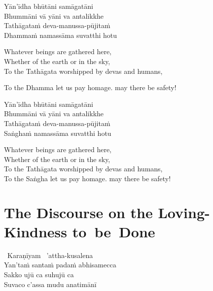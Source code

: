 \begin{pali-hang-continued}
  Yān'īdha bhūtāni samāgatāni\\
  Bhummāni vā yāni va antalikkhe\\
  Tathāgataṁ deva-manussa-pūjitaṁ\\
  Dhammaṁ namassāma suvatthi hotu
\end{pali-hang-continued}

\begin{english-verses}
  Whatever beings are gathered here,\\
  Whether of the earth or in the sky,\\
  To the Tathāgata worshipped by devas and humans,\\
  \begin{english-hang-together}
  To the Dhamma let us pay homage. may there be safety!
  \end{english-hang-together}
\end{english-verses}

\ifbfive\clearpage\fi

\begin{pali-hang-continued}
  Yān'īdha bhūtāni samāgatāni\\
  Bhummāni vā yāni va antalikkhe\\
  Tathāgataṁ deva-manussa-pūjitaṁ\\
  Saṅghaṁ namassāma suvatthi hotu
\end{pali-hang-continued}

\begin{english-verses}
  Whatever beings are gathered here,\\
  Whether of the earth or in the sky,\\
  To the Tathāgata worshipped by devas and humans, \\
  To the Saṅgha let us pay homage. may there be safety!
\end{english-verses}

\suttaRef{[Snp 2.1]}



\section{The Discourse on the Loving-Kindness \mbox{to}~be~Done}
\label{discourse-on-loving-kindness}

\begin{pali-hang-together}
  \anglebracketleft\ \hspace{-0.5mm}Karaṇīyam \hspace{-0.5mm}\anglebracketright\ 'attha-kusalena\\
  Yan'taṁ santaṁ padaṁ abhisamecca\\
  Sakko ujū ca suhujū ca\\
  Suvaco c'assa mudu anatimānī
\end{pali-hang-together}

